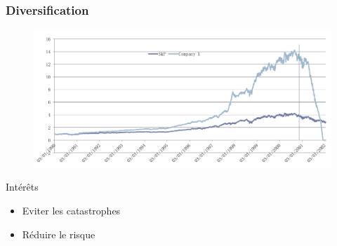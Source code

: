 \begin{frame}
    \frametitle{Diversification}
      \begin{figure}
	  \includegraphics[scale=0.5]{images/exempleChuteEntreprise.png}   
      \end{figure}   
      \begin{block}{Intérêts}
	\begin{itemize}
	 \item Eviter les catastrophes
	 \item Réduire le risque
	\end{itemize}
      \end{block}

\end{frame}

